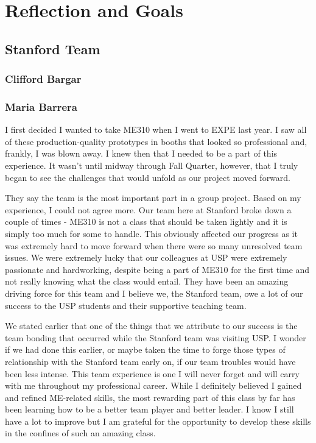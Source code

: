 \section{Reflection and Goals}

\subsection{Stanford Team}

\subsubsection{Clifford Bargar}

\subsubsection{Maria Barrera}
I first decided I wanted to take ME310 when I went to EXPE last year. I saw all of these production-quality prototypes in booths that looked so professional and, frankly, I was blown away. I knew then that I needed to be a part of this experience. It wasn't until midway through Fall Quarter, however, that I truly began to see the challenges that would unfold as our project moved forward.

They say the team is the most important part in a group project. Based on my experience, I could not agree more. Our team here at Stanford broke down a couple of times - ME310 is not a class that should be taken lightly and it is simply too much for some to handle. This obviously affected our progress as it was extremely hard to move forward when there were so many unresolved team issues. We were extremely lucky that our colleagues at USP were extremely passionate and hardworking, despite being a part of ME310 for the first time and not really knowing what the class would entail. They have been an amazing driving force for this team and I believe we, the Stanford team, owe a lot of our success to the USP students and their supportive teaching team.

We stated earlier that one of the things that we attribute to our success is the team bonding that occurred while the Stanford team was visiting USP. I wonder if we had done this earlier, or maybe taken the time to forge those types of relationship with the Stanford team early on, if our team troubles would have been less intense. This team experience is one I will never forget and will carry with me throughout my professional career. While I definitely believed I gained and refined ME-related skills, the most rewarding part of this class by far has been learning how to be a better team player and better leader. I know I still have a lot to improve but I am grateful for the opportunity to develop these skills in the confines of such an amazing class. 

